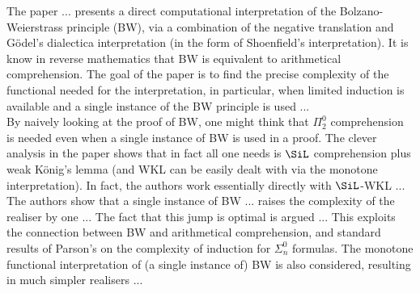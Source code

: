 The paper ... presents a direct computational interpretation of the
Bolzano-Weierstrass principle (BW), via a combination of the negative translation
and G\"odel's dialectica interpretation (in the form of Shoenfield's interpretation).
It is know in reverse mathematics that BW is equivalent to arithmetical
comprehension. The goal of the paper is to find the precise complexity of the
functional needed for the interpretation, in particular, when limited induction
is available and a single instance of the BW principle is used ... \\
By naively looking at the proof of BW, one might think that $\Pi^0_2$ comprehension
is needed even when a single instance of BW is used in a proof. The
clever analysis in the paper shows that in fact all one needs is $\SiL$ comprehension
plus weak K\"onig's lemma (and WKL can be easily dealt with via the monotone
interpretation). In fact, the authors work essentially directly with $\SiL$-WKL ...\\
The authors show that a single instance of BW ... raises the complexity of the realiser by one ... The fact that this jump is optimal is
argued ... This exploits the connection between BW and
arithmetical comprehension, and standard results of Parson's on the complexity
of induction for 
$\Sigma^0_n$ formulas. The monotone functional interpretation of (a
single instance of) BW is also considered, resulting in much simpler realisers ...
